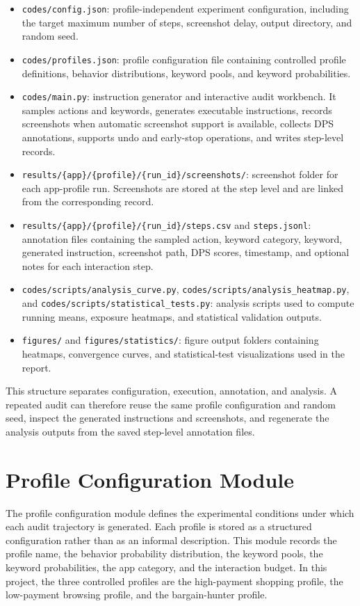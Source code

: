 \begin{itemize}
	\item \texttt{codes/config.json}: profile-independent experiment configuration, including the target maximum number of steps, screenshot delay, output directory, and random seed.
	\item \texttt{codes/profiles.json}: profile configuration file containing controlled profile definitions, behavior distributions, keyword pools, and keyword probabilities.
	\item \texttt{codes/main.py}: instruction generator and interactive audit workbench. It samples actions and keywords, generates executable instructions, records screenshots when automatic screenshot support is available, collects DPS annotations, supports undo and early-stop operations, and writes step-level records.
	\item \texttt{results/\{app\}/\{profile\}/\{run\_id\}/screenshots/}: screenshot folder for each app-profile run. Screenshots are stored at the step level and are linked from the corresponding record.
	\item \texttt{results/\{app\}/\{profile\}/\{run\_id\}/steps.csv} and \texttt{steps.jsonl}: annotation files containing the sampled action, keyword category, keyword, generated instruction, screenshot path, DPS scores, timestamp, and optional notes for each interaction step.
	\item \texttt{codes/scripts/analysis\_curve.py}, \texttt{codes/scripts/analysis\_heatmap.py}, and \texttt{codes/scripts/statistical\_tests.py}: analysis scripts used to compute running means, exposure heatmaps, and statistical validation outputs.
	\item \texttt{figures/} and \texttt{figures/statistics/}: figure output folders containing heatmaps, convergence curves, and statistical-test visualizations used in the report.
\end{itemize}

This structure separates configuration, execution, annotation, and analysis. A repeated audit can therefore reuse the same profile configuration and random seed, inspect the generated instructions and screenshots, and regenerate the analysis outputs from the saved step-level annotation files.

\section{Profile Configuration Module}

The profile configuration module defines the experimental conditions under which each audit trajectory is generated. Each profile is stored as a structured configuration rather than as an informal description. This module records the profile name, the behavior probability distribution, the keyword pools, the keyword probabilities, the app category, and the interaction budget. In this project, the three controlled profiles are the high-payment shopping profile, the low-payment browsing profile, and the bargain-hunter profile.

